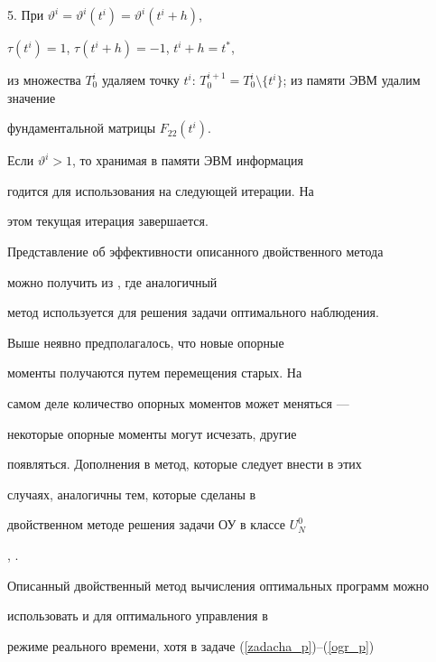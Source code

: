 5. При $\vartheta^i = \vartheta^i(t^i) = \vartheta^i(t^i+h)$,


$\tau(t^i) = 1$, $\tau(t^i+h) = -1$, $t^i+h = t^*$,


из множества $T_0^i$ удаляем точку $t^i$: $T_0^{i+1} = T_0^i


\setminus \{t^i\}$; из памяти ЭВМ удалим значение


фундаментальной матрицы $F_{22}(t^i)$.





Если $\vartheta^i > 1$, то хранимая в памяти ЭВМ информация


годится для использования на следующей итерации. На


этом текущая итерация завершается.





Представление об эффективности описанного двойственного метода


можно получить из \cite{Opt_nabl}, где аналогичный


метод используется для решения задачи оптимального наблюдения.





\begin{note}


Выше неявно предполагалось, что новые опорные


моменты получаются путем перемещения старых. На


самом деле количество опорных моментов может меняться ---


некоторые опорные моменты могут исчезать, другие


появляться. Дополнения в метод, которые следует внести в этих


случаях, аналогичны тем, которые сделаны в


двойственном методе решения задачи ОУ в классе $U_N^0$


\cite{ZVM_2000}, \cite{SIAM}.


\end{note}





Описанный двойственный метод вычисления оптимальных программ можно


использовать и для оптимального управления в


режиме реального времени, хотя в задаче (\ref{zadacha_p})--(\ref{ogr_p})


